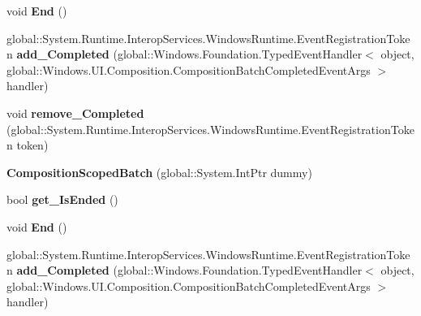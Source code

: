 \begin{DoxyCompactItemize}
\mbox{\label{class_windows_1_1_u_i_1_1_composition_1_1_composition_scoped_batch_ac9207d343cd71dfa95d2843f2cad44a3}} 
void {\bfseries End} ()
\item 
\mbox{\label{class_windows_1_1_u_i_1_1_composition_1_1_composition_scoped_batch_a2eaf35d8ee5b83da80dbb51535e15735}} 
global\+::\+System.\+Runtime.\+Interop\+Services.\+Windows\+Runtime.\+Event\+Registration\+Token {\bfseries add\+\_\+\+Completed} (global\+::\+Windows.\+Foundation.\+Typed\+Event\+Handler$<$ object, global\+::\+Windows.\+U\+I.\+Composition.\+Composition\+Batch\+Completed\+Event\+Args $>$ handler)
\item 
\mbox{\label{class_windows_1_1_u_i_1_1_composition_1_1_composition_scoped_batch_a1fca5e233b1f087147733edf215d083d}} 
void {\bfseries remove\+\_\+\+Completed} (global\+::\+System.\+Runtime.\+Interop\+Services.\+Windows\+Runtime.\+Event\+Registration\+Token token)
\item 
\mbox{\label{class_windows_1_1_u_i_1_1_composition_1_1_composition_scoped_batch_aabd378de67b654d720bcd539222f242d}} 
{\bfseries Composition\+Scoped\+Batch} (global\+::\+System.\+Int\+Ptr dummy)
\item 
\mbox{\label{class_windows_1_1_u_i_1_1_composition_1_1_composition_scoped_batch_ad036352a5e49eca6ca9a5625c9241c44}} 
bool {\bfseries get\+\_\+\+Is\+Ended} ()
\item 
\mbox{\label{class_windows_1_1_u_i_1_1_composition_1_1_composition_scoped_batch_ac9207d343cd71dfa95d2843f2cad44a3}} 
void {\bfseries End} ()
\item 
\mbox{\label{class_windows_1_1_u_i_1_1_composition_1_1_composition_scoped_batch_a2eaf35d8ee5b83da80dbb51535e15735}} 
global\+::\+System.\+Runtime.\+Interop\+Services.\+Windows\+Runtime.\+Event\+Registration\+Token {\bfseries add\+\_\+\+Completed} (global\+::\+Windows.\+Foundation.\+Typed\+Event\+Handler$<$ object, global\+::\+Windows.\+U\+I.\+Composition.\+Composition\+Batch\+Completed\+Event\+Args $>$ handler)

\end{DoxyCompactItemize}
